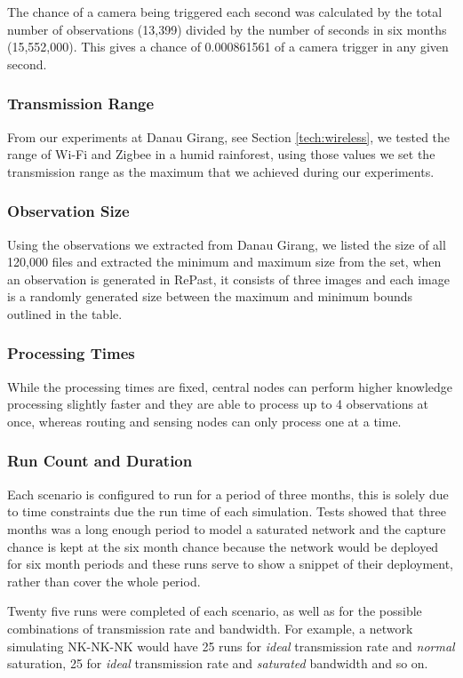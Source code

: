 	The chance of a camera being triggered each second was calculated by the total number of observations (13,399) divided by the number of seconds in six months (15,552,000). This gives a chance of 0.000861561 of a camera trigger in any given second.

	\subsubsection{Transmission Range}
	From our experiments at Danau Girang, see Section \ref{tech:wireless}, we tested the range of Wi-Fi and Zigbee in a humid rainforest, using those values we set the transmission range as the maximum that we achieved during our experiments.

	\subsubsection{Observation Size}
	Using the observations we extracted from Danau Girang, we listed the size of all 120,000 files and extracted the minimum and maximum size from the set, when an observation is generated in RePast, it consists of three images and each image is a randomly generated size between the maximum and minimum bounds outlined in the table.

	\subsubsection{Processing Times}
	While the processing times are fixed, central nodes can perform higher knowledge processing slightly faster and they are able to process up to 4 observations at once, whereas routing and sensing nodes can only process one at a time.
	
	\subsubsection{Run Count and Duration}
	Each scenario is configured to run for a period of three months, this is solely due to time constraints due the run time of each simulation. Tests showed that three months was a long enough period to model a saturated network and the capture chance is kept at the six month chance because the network would be deployed for six month periods and these runs serve to show a snippet of their deployment, rather than cover the whole period.
	
	Twenty five runs were completed of each scenario, as well as for the possible combinations of transmission rate and bandwidth. For example, a network simulating NK-NK-NK would have 25 runs for \textit{ideal} transmission rate and \textit{normal} saturation, 25 for \textit{ideal} transmission rate and \textit{saturated} bandwidth and so on.

